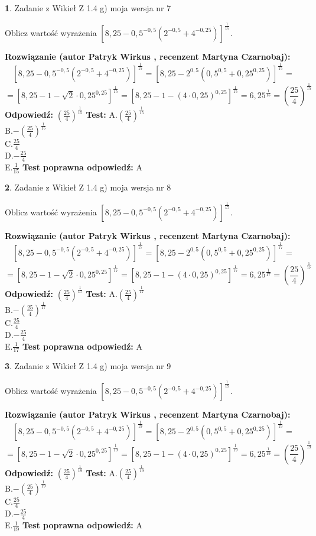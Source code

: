 \documentclass[12pt, a4paper]{article}
\theoremstyle{definition} %
\newtheorem{zad}{}
\newcommand{\zadStart}[1]{\begin{zad}#1\newline}
\newcommand{\zadStop}{\end{zad}}
\newcommand{\rozwStart}[2]{\noindent \textbf{Rozwiązanie (autor #1 , recenzent #2): }\newline}
\newcommand{\rozwStop}{\newline}
\newcommand{\odpStart}{\noindent \textbf{Odpowiedź:}\newline}
\newcommand{\odpStop}{\newline}
\newcommand{\testStart}{\noindent \textbf{Test:}\newline}
\newcommand{\testStop}{\newline}
\newcommand{\kluczStart}{\noindent \textbf{Test poprawna odpowiedź:}\newline}
\newcommand{\kluczStop}{\newline}
\begin{document}
\zadStart{Zadanie z Wikieł Z 1.4 g) moja wersja nr 7}

Oblicz wartość wyrażenia $[8,25-0,5^{-0,5}(2^{-0,5}+4^{-0,25})]^{\frac{1}{15}}$.
\zadStop
\rozwStart{Patryk Wirkus}{Martyna Czarnobaj}
$$[8,25-0,5^{-0,5}(2^{-0,5}+4^{-0,25})]^{\frac{1}{15}} = [8,25-2^{0,5}(0,5^{0,5}+0,25^{0,25})]^{\frac{1}{15}} =$$
$$=[8,25 - 1 - \sqrt{2} \cdot 0,25^{0,25}]^{\frac{1}{15}} = [8,25 - 1 - (4\cdot 0,25)^{0,25}]^{\frac{1}{15}} = 6,25^{\frac{1}{15}} = (\frac{25}{4})^{\frac{1}{15}}$$
\rozwStop
\odpStart
$(\frac{25}{4})^{\frac{1}{15}}$
\odpStop
\testStart
A.$(\frac{25}{4})^{\frac{1}{15}}$\\ B.$-(\frac{25}{4})^{\frac{1}{15}}$\\ C.$\frac{25}{4}$\\ D.$-\frac{25}{4}$\\ E.$\frac{1}{15}$
\testStop
\kluczStart
A
\kluczStop



\zadStart{Zadanie z Wikieł Z 1.4 g) moja wersja nr 8}

Oblicz wartość wyrażenia $[8,25-0,5^{-0,5}(2^{-0,5}+4^{-0,25})]^{\frac{1}{17}}$.
\zadStop
\rozwStart{Patryk Wirkus}{Martyna Czarnobaj}
$$[8,25-0,5^{-0,5}(2^{-0,5}+4^{-0,25})]^{\frac{1}{17}} = [8,25-2^{0,5}(0,5^{0,5}+0,25^{0,25})]^{\frac{1}{17}} =$$
$$=[8,25 - 1 - \sqrt{2} \cdot 0,25^{0,25}]^{\frac{1}{17}} = [8,25 - 1 - (4\cdot 0,25)^{0,25}]^{\frac{1}{17}} = 6,25^{\frac{1}{17}} = (\frac{25}{4})^{\frac{1}{17}}$$
\rozwStop
\odpStart
$(\frac{25}{4})^{\frac{1}{17}}$
\odpStop
\testStart
A.$(\frac{25}{4})^{\frac{1}{17}}$\\ B.$-(\frac{25}{4})^{\frac{1}{17}}$\\ C.$\frac{25}{4}$\\ D.$-\frac{25}{4}$\\ E.$\frac{1}{17}$
\testStop
\kluczStart
A
\kluczStop



\zadStart{Zadanie z Wikieł Z 1.4 g) moja wersja nr 9}

Oblicz wartość wyrażenia $[8,25-0,5^{-0,5}(2^{-0,5}+4^{-0,25})]^{\frac{1}{19}}$.
\zadStop
\rozwStart{Patryk Wirkus}{Martyna Czarnobaj}
$$[8,25-0,5^{-0,5}(2^{-0,5}+4^{-0,25})]^{\frac{1}{19}} = [8,25-2^{0,5}(0,5^{0,5}+0,25^{0,25})]^{\frac{1}{19}} =$$
$$=[8,25 - 1 - \sqrt{2} \cdot 0,25^{0,25}]^{\frac{1}{19}} = [8,25 - 1 - (4\cdot 0,25)^{0,25}]^{\frac{1}{19}} = 6,25^{\frac{1}{19}} = (\frac{25}{4})^{\frac{1}{19}}$$
\rozwStop
\odpStart
$(\frac{25}{4})^{\frac{1}{19}}$
\odpStop
\testStart
A.$(\frac{25}{4})^{\frac{1}{19}}$\\ B.$-(\frac{25}{4})^{\frac{1}{19}}$\\ C.$\frac{25}{4}$\\ D.$-\frac{25}{4}$\\ E.$\frac{1}{19}$
\testStop
\kluczStart
A
\kluczStop
\end{document}
